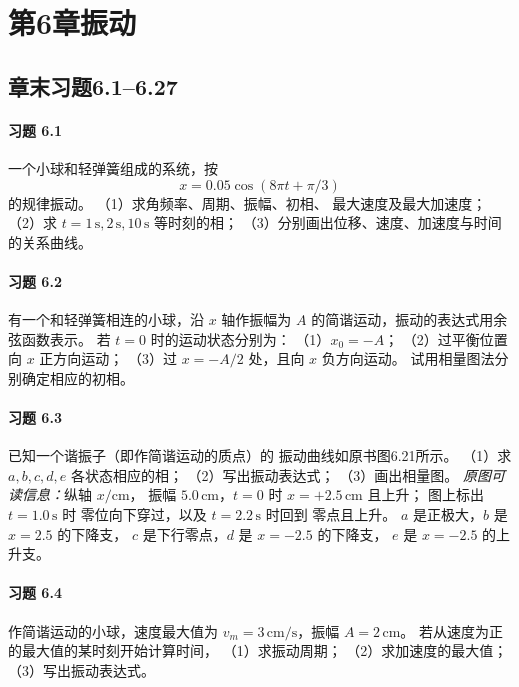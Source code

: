 \section*{第6章\quad 振动}
\subsection*{章末习题6.1--6.27}

\paragraph{习题 6.1}
一个小球和轻弹簧组成的系统，按
\[
 x=0.05\cos(8\pi t+\pi/3)
\]
的规律振动。
（1）求角频率、周期、振幅、初相、
最大速度及最大加速度；
（2）求 \(t=1\,\mathrm s,2\,\mathrm s,10\,\mathrm s\)
等时刻的相；
（3）分别画出位移、速度、加速度与时间的关系曲线。

\paragraph{习题 6.2}
有一个和轻弹簧相连的小球，沿 \(x\) 轴作振幅为
\(A\) 的简谐运动，振动的表达式用余弦函数表示。
若 \(t=0\) 时的运动状态分别为：
（1）\(x_0=-A\)；
（2）过平衡位置向 \(x\) 正方向运动；
（3）过 \(x=-A/2\) 处，且向 \(x\) 负方向运动。
试用相量图法分别确定相应的初相。

\paragraph{习题 6.3}
已知一个谐振子（即作简谐运动的质点）的
振动曲线如原书图6.21所示。
（1）求 \(a,b,c,d,e\) 各状态相应的相；
（2）写出振动表达式；
（3）画出相量图。
\textit{原图可读信息：}纵轴 \(x/\mathrm{cm}\)，
振幅 \(5.0\,\mathrm{cm}\)，\(t=0\) 时
\(x=+2.5\,\mathrm{cm}\) 且上升；
图上标出 \(t=1.0\,\mathrm s\) 时
零位向下穿过，以及 \(t=2.2\,\mathrm s\)
时回到 零点且上升。
\(a\) 是正极大，\(b\) 是 \(x=2.5\) 的下降支，
\(c\) 是下行零点，\(d\) 是 \(x=-2.5\) 的下降支，
\(e\) 是 \(x=-2.5\) 的上升支。

\paragraph{习题 6.4}
作简谐运动的小球，速度最大值为
\(v_m=3\,\mathrm{cm/s}\)，振幅
\(A=2\,\mathrm{cm}\)。
若从速度为正的最大值的某时刻开始计算时间，
（1）求振动周期；
（2）求加速度的最大值；
（3）写出振动表达式。

